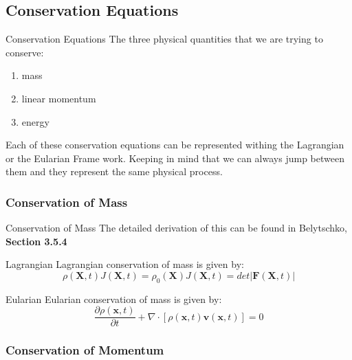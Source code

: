 \documentclass{beamer}
\begin{document}
\subsection{Conservation Equations}
\begin{frame}{Conservation Equations}
	The three physical quantities that we are trying to conserve:
	\begin{enumerate}
		\item mass
		\item linear momentum
		\item energy
	\end{enumerate}
\vspace{1cm}
	Each of these conservation equations can be represented withing the Lagrangian or the Eularian Frame 
    work. Keeping in mind that we can always jump between them and they represent the same physical process.
\end{frame}

\subsubsection{Conservation of Mass}
\begin{frame}{Conservation of Mass}
The detailed derivation of this can be found in Belytschko, \textbf{Section 3.5.4}
	\begin{block}{Lagrangian}
		Lagrangian conservation of mass is given by:
		\begin{subequations}
			\begin{equation}
				\rho(\bm{X},t)J(\bm{X},t)=\rho_{0}(\bm{X})
			\end{equation}
			\begin{equation}
				J(\bm{X},t)=det|\bm{F}(\bm{X},t)|
			\end{equation}
		\end{subequations}
	\end{block}
\begin{block}{Eularian}
	Eularian conservation of mass is given by:
	\begin{equation}
		\frac{\partial \rho(\bm{x},t)}{\partial t}+\nabla\cdot[\rho(\bm{x},t)\bm{v}						(\bm{x},t)]=0
	\end{equation}
\end{block}
\end{frame}

\subsubsection{Conservation of Momentum}
\end{document}

